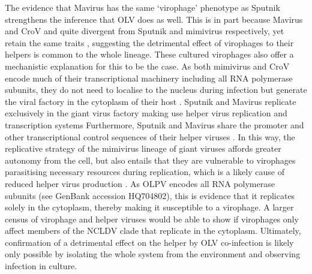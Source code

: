 The evidence that Mavirus has the same `virophage' phenotype as Sputnik strengthens the inference that \ac{OLV} does as well.
This is in part because Mavirus and \ac{CroV} and quite divergent from Sputnik and mimivirus respectively, yet retain the same traits \cite{Fischer2010, Fischer2011a}, suggesting the detrimental effect of virophages to their helpers is common to the whole lineage.
These cultured virophages also offer a mechanistic explanation for this to be the case.
As both mimivirus and \ac{CroV} encode much of their transcriptional machinery including all \textsc{RNA} polymerase subunits, they do not need to localise to the nucleus during infection but generate the viral factory in the cytoplasm of their host \cite{LaScola2008, Fischer2011a}.
Sputnik and Mavirus replicate exclusively in the giant virus factory making use helper virus replication and transcription systems \cite{LaScola2008, Fischer2011a}
Furthermore, Sputnik and Mavirus share the promoter and other transcriptional control sequences of their helper viruses \cite{Claverie2009, Fischer2011a}.
In this way, the replicative strategy of the mimivirus lineage of giant viruses affords greater autonomy from the cell, but also entails that they are vulnerable to virophages parasitising necessary resources during replication, which is a likely cause of reduced helper virus production \cite{Claverie2009, Fischer2011a, Fischer2011b}.
As \ac{OLPV} encodes all \textsc{RNA} polymerase subunits (see GenBank accession HQ704802), this is evidence that it replicates solely in the cytoplasm, thereby making it susceptible to a virophage.
A larger census of virophage and helper viruses would be able to show if virophages only affect members of the \ac{NCLDV} clade that replicate in the cytoplasm.
Ultimately, confirmation of a detrimental effect on the helper by \ac{OLV} co-infection is likely only possible by isolating the whole system from the environment and observing infection in culture.

